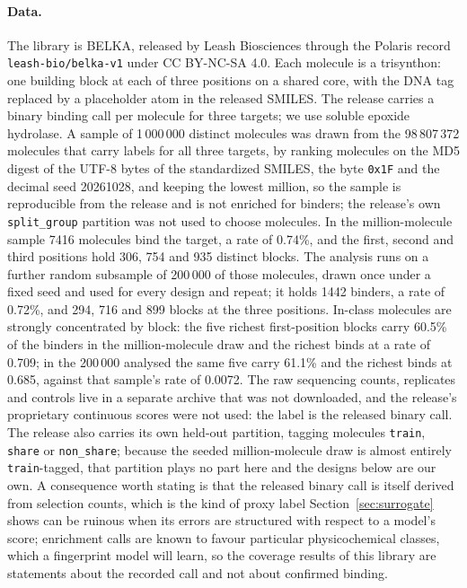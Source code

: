 \documentclass[10pt]{article}
\begin{document}
\paragraph{Data.} The library is BELKA,\citep{Quigley2024BELKA} released by Leash Biosciences through the Polaris record \texttt{leash-bio/belka-v1} under CC BY-NC-SA 4.0. Each molecule is a trisynthon: one building block at each of three positions on a shared core, with the DNA tag replaced by a placeholder atom in the released SMILES. The release carries a binary binding call per molecule for three targets; we use soluble epoxide hydrolase. A sample of 1\,000\,000 distinct molecules was drawn from the 98\,807\,372 molecules that carry labels for all three targets, by ranking molecules on the MD5 digest of the UTF-8 bytes of the standardized SMILES, the byte \texttt{0x1F} and the decimal seed 20261028, and keeping the lowest million, so the sample is reproducible from the release and is not enriched for binders; the release's own \texttt{split\_group} partition was not used to choose molecules. In the million-molecule sample 7416 molecules bind the target, a rate of 0.74\%, and the first, second and third positions hold 306, 754 and 935 distinct blocks. The analysis runs on a further random subsample of 200\,000 of those molecules, drawn once under a fixed seed and used for every design and repeat; it holds 1442 binders, a rate of 0.72\%, and 294, 716 and 899 blocks at the three positions. In-class molecules are strongly concentrated by block: the five richest first-position blocks carry 60.5\% of the binders in the million-molecule draw and the richest binds at a rate of 0.709; in the 200\,000 analysed the same five carry 61.1\% and the richest binds at 0.685, against that sample's rate of 0.0072. The raw sequencing counts, replicates and controls live in a separate archive that was not downloaded, and the release's proprietary continuous scores were not used: the label is the released binary call. The release also carries its own held-out partition, tagging molecules \texttt{train}, \texttt{share} or \texttt{non\_share}; because the seeded million-molecule draw is almost entirely \texttt{train}-tagged, that partition plays no part here and the designs below are our own. A consequence worth stating is that the released binary call is itself derived from selection counts, which is the kind of proxy label Section~\ref{sec:surrogate} shows can be ruinous when its errors are structured with respect to a model's score; enrichment calls are known to favour particular physicochemical classes, which a fingerprint model will learn, so the coverage results of this library are statements about the recorded call and not about confirmed binding.
\end{document}
